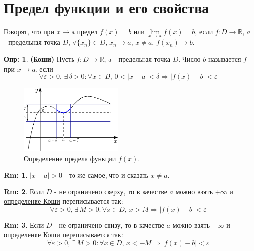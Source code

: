 \documentclass[12pt]{article}
\theoremstyle{definition}
\newtheorem{defn}{Опр:}
\newtheorem{rem}{Rm:}
\begin{document}

\section*{Предел функции и его свойства}

Говорят, что при $x \to a$ предел $f(x) = b$ или $\lim\limits_{x \to a}f(x) =b$, если $f\colon D \to \mathbb{R}$, $a$ - предельная точка $D$, $\forall \{x_n\} \in D, \, x_n \to a, \, x\neq a, \, f(x_n) \to b$.


\begin{defn}\textbf{(Коши)} 
	Пусть $f\colon D \to \mathbb{R}$, $a$ - предельная точка $D$. Число $b$ называется  $f$ при $x \to a$, если 
	$$\forall \varepsilon > 0, \, \exists \, \delta > 0 \colon \forall x \in D, \, 0 < |x-a| < \delta \Rightarrow |f(x) -b| < \varepsilon$$	
\end{defn}

\begin{figure}[H]
	\centering
	\includegraphics[width=0.45\textwidth]{15_1.eps}
	\caption{Определение предела функции $f(x)$.}
	\label{15_1}
\end{figure}

\begin{rem}
	$|x-a| > 0$ - то же самое, что и сказать $x \neq a$.
\end{rem}

\begin{rem}
	Если $D$ - не ограничено сверху, то в качестве $a$ можно взять $+\infty$ и \uline{определение Коши} переписывается так:
	$$\forall \varepsilon > 0, \, \exists \, M > 0 \colon \forall x \in D, \, x > M \Rightarrow |f(x) -b| < \varepsilon$$	
\end{rem}

 
\begin{rem}
	Если $D$ - не ограничено снизу, то в качестве $a$ можно взять $-\infty$ и \uline{определение Коши} переписывается так:
	$$\forall \varepsilon > 0, \, \exists \, M > 0 \colon \forall x \in D, \, x < -M \Rightarrow |f(x) -b| < \varepsilon$$	
\end{rem}
\end{document}
